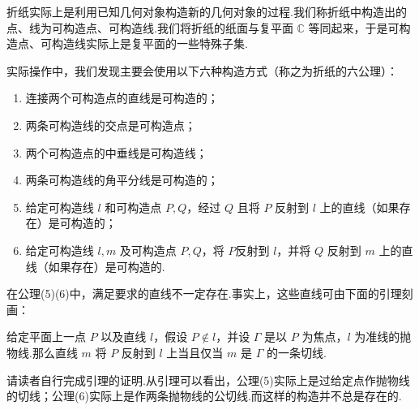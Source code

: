 折纸实际上是利用已知几何对象构造新的几何对象的过程.我们称折纸中构造出的点、线为可构造点、可构造线.我们将折纸的纸面与复平面 $\mathbb{C}$ 等同起来，于是可构造点、可构造线实际上是复平面的一些特殊子集.

实际操作中，我们发现主要会使用以下六种构造方式（称之为折纸的六公理）：

\begin{enumerate}[wide,itemindent=2em,label=(\arabic*)]
    \item 连接两个可构造点的直线是可构造的；
    \item 两条可构造线的交点是可构造点；
    \item 两个可构造点的中垂线是可构造线；
    \item 两条可构造线的角平分线是可构造的；
    \item 给定可构造线 $l$ 和可构造点 $P,Q$，经过 $Q$ 且将 $P$ 反射到 $l$ 上的直线（如果存在）是可构造的；
    \item 给定可构造线 $l,m$ 及可构造点 $P,Q$，将 $P$反射到 $l$，并将 $Q$ 反射到 $m$ 上的直线（如果存在）是可构造的.
\end{enumerate}

在公理(5)(6)中，满足要求的直线不一定存在.事实上，这些直线可由下面的引理刻画：

\begin{lemma}
    给定平面上一点 $P$ 以及直线 $l$，假设 $P\notin l$，并设 $\Gamma$ 是以 $P$ 为焦点，$l$ 为准线的抛物线.那么直线 $m$ 将 $P$ 反射到 $l$ 上当且仅当 $m$ 是 $\Gamma$ 的一条切线.
\end{lemma}

请读者自行完成引理的证明.从引理可以看出，公理(5)实际上是过给定点作抛物线的切线；公理(6)实际上是作两条抛物线的公切线.而这样的构造并不总是存在的.
